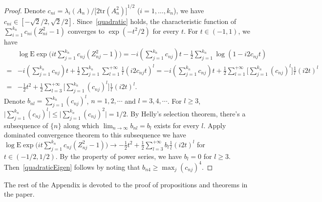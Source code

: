\documentclass[review]{elsarticle}
\theoremstyle{plain}
\theoremstyle{definition}
\theoremstyle{remark}
\begin{document}
\begin{proof}
    Denote $c_{ni}=\lambda_i(A_n)/{\big[2\mathrm{tr}(A_n^2)\big]}^{1/2}$ ($i=1,\ldots,k_n$), we have $c_{ni}\in[-\sqrt{2}/2,\sqrt{2}/2]$.
    Since~\ref{quadratic} holds, the characteristic function of
        $
        \sum_{i=1}^{k_n}c_{ni}(Z_{ni}^2-1)
    $
    converges to $\exp(-t^2/2)$ for every $t$. For $t\in (-1,1)$, we have
    \begin{equation*}
        \begin{aligned}
            &\log \mathrm{E}\exp{\big(it \sum_{j=1}^{k_n}c_{nj}(Z_{nj}^2-1)\big)}
            =
            -i(\sum_{j=1}^{k_n}c_{nj})t-
            \frac{1}{2}\sum_{j=1}^{k_n}\log(1-i2c_{nj}t)\\
            =&
            -i(\sum_{j=1}^{k_n}c_{nj})t+
            \frac{1}{2}\sum_{j=1}^{k_n}\sum_{l=1}^{+\infty}\frac{1}{l}{(i2c_{nj}t)}^l
            =
            -i(\sum_{j=1}^{k_n}c_{nj})t+
            \frac{1}{2}\sum_{l=1}^{+\infty}\Big[\sum_{j=1}^{k_n}{(c_{nj})}^l\Big]\frac{1}{l}{(i2t)}^l\\
            =&-\frac{1}{2}t^2+
            \frac{1}{2}\sum_{l=3}^{+\infty}\Big[\sum_{j=1}^{k_n}{(c_{nj})}^l\Big]\frac{1}{l}{(i2t)}^l.
        \end{aligned}
    \end{equation*}
    Denote $b_{nl}=\sum_{j=1}^{k_n}{(c_{nj})}^l$, $n=1,2,\cdots$ and $l=3,4,\cdots$. For $l\geq 3$, $\big|\sum_{j=1}^{k_n}{(c_{nj})}^l\big|\leq \big|\sum_{j=1}^{k_n}{(c_{nj})}^2\big|=1/2$.
    By Helly's selection theorem, there's a subsequence of $\{n\}$ along which $\lim_{n\to \infty}b_{nl}=b_l$ exists for every $l$.
    Apply dominated convergence theorem to this subsequence we have
            $\log \mathrm{E}\exp{\big(it \sum_{j=1}^{k_n}c_{nj}(Z_{nj}^2-1)\big)}\to
            -\frac{1}{2}t^2+
            \frac{1}{2}\sum_{l=3}^{+\infty}b_l\frac{1}{l}{(i2t)}^l$ for $t\in(-1/2,1/2)$.
            By the property of power series, we have $b_l=0$ for $l\geq 3$. Then~\ref{quadraticEigen} follows by noting that $b_{n4}\geq \max_j{(c_{nj})}^4$.
\end{proof}




The rest of the Appendix is devoted to the proof of propositions and theorems in the paper.
\end{document}
